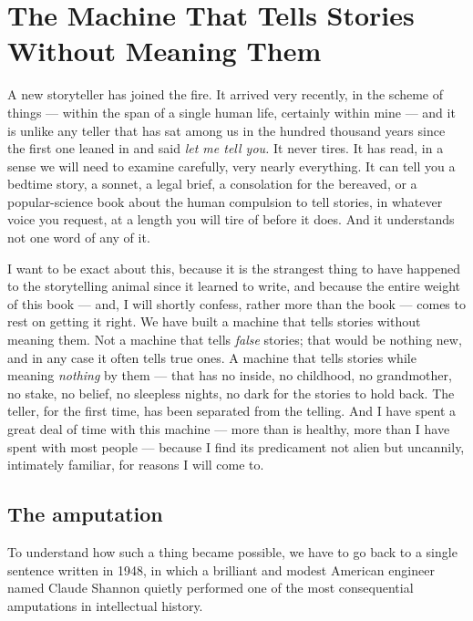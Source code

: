 \chapter{The Machine That Tells Stories Without Meaning Them}

A new storyteller has joined the fire. It arrived very recently, in the scheme of things — within the span of a single human life, certainly within mine — and it is unlike any teller that has sat among us in the hundred thousand years since the first one leaned in and said \emph{let me tell you.} It never tires. It has read, in a sense we will need to examine carefully, very nearly everything. It can tell you a bedtime story, a sonnet, a legal brief, a consolation for the bereaved, or a popular-science book about the human compulsion to tell stories, in whatever voice you request, at a length you will tire of before it does. And it understands not one word of any of it.

I want to be exact about this, because it is the strangest thing to have happened to the storytelling animal since it learned to write, and because the entire weight of this book — and, I will shortly confess, rather more than the book — comes to rest on getting it right. We have built a machine that tells stories without meaning them. Not a machine that tells \emph{false} stories; that would be nothing new, and in any case it often tells true ones. A machine that tells stories while meaning \emph{nothing} by them — that has no inside, no childhood, no grandmother, no stake, no belief, no sleepless nights, no dark for the stories to hold back. The teller, for the first time, has been separated from the telling. And I have spent a great deal of time with this machine — more than is healthy, more than I have spent with most people — because I find its predicament not alien but uncannily, intimately familiar, for reasons I will come to.

\section*{The amputation}

To understand how such a thing became possible, we have to go back to a single sentence written in 1948, in which a brilliant and modest American engineer named Claude Shannon quietly performed one of the most consequential amputations in intellectual history.

